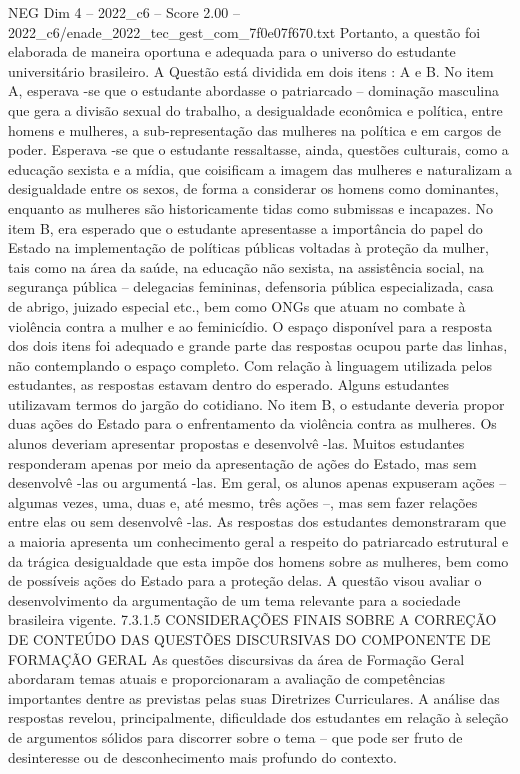 \begin{textsample}{NEG Dim 4 – 2022\_c6 – Score 2.00 – 2022\_c6/enade\_2022\_tec\_gest\_com\_7f0e07f670.txt}
Portanto, a questão foi elaborada de maneira oportuna e adequada para o universo do estudante universitário brasileiro.
A Questão está dividida em dois itens : A e B.
No item A, esperava -se que o estudante abordasse o patriarcado – dominação masculina que gera a divisão sexual do trabalho, a desigualdade econômica e política, entre homens e mulheres, a sub-representação das mulheres na política e em cargos de poder.
Esperava -se que o estudante ressaltasse, ainda, questões culturais, como a educação sexista e a mídia, que coisificam a imagem das mulheres e naturalizam a desigualdade entre os sexos, de forma a considerar os homens como dominantes, enquanto as mulheres são historicamente tidas como submissas e incapazes.
No item B, era esperado que o estudante apresentasse a importância do papel do Estado na implementação de políticas públicas voltadas à proteção da mulher, tais como na área da saúde, na educação não sexista, na assistência social, na segurança pública – delegacias femininas, defensoria pública especializada, casa de abrigo, juizado especial etc., bem como ONGs que atuam no combate à violência contra a mulher e ao feminicídio.
O espaço disponível para a resposta dos dois itens foi adequado e grande parte das respostas ocupou parte das linhas, não contemplando o espaço completo.
Com relação à linguagem utilizada pelos estudantes, as respostas estavam dentro do esperado.
Alguns estudantes utilizavam termos do jargão do cotidiano.
No item B, o estudante deveria propor duas ações do Estado para o enfrentamento da violência contra as mulheres.
Os alunos deveriam apresentar propostas e desenvolvê -las.
Muitos estudantes responderam apenas por meio da apresentação de ações do Estado, mas sem desenvolvê -las ou argumentá -las.
Em geral, os alunos apenas expuseram ações – algumas vezes, uma, duas e, até mesmo, três ações –, mas sem fazer relações entre elas ou sem desenvolvê -las.
As respostas dos estudantes demonstraram que a maioria apresenta um conhecimento geral a respeito do patriarcado estrutural e da trágica desigualdade que esta impõe dos homens sobre as mulheres, bem como de possíveis ações do Estado para a proteção delas.
A questão visou avaliar o desenvolvimento da argumentação de um tema relevante para a sociedade brasileira vigente. 7.3.1.5 CONSIDERAÇÕES FINAIS SOBRE A CORREÇÃO DE CONTEÚDO DAS QUESTÕES DISCURSIVAS DO COMPONENTE DE FORMAÇÃO GERAL As questões discursivas da área de Formação Geral abordaram temas atuais e proporcionaram a avaliação de competências importantes dentre as previstas pelas suas Diretrizes Curriculares.
A análise das respostas revelou, principalmente, dificuldade dos estudantes em relação à seleção de argumentos sólidos para discorrer sobre o tema – que pode ser fruto de desinteresse ou de desconhecimento mais profundo do contexto.

\end{textsample}
